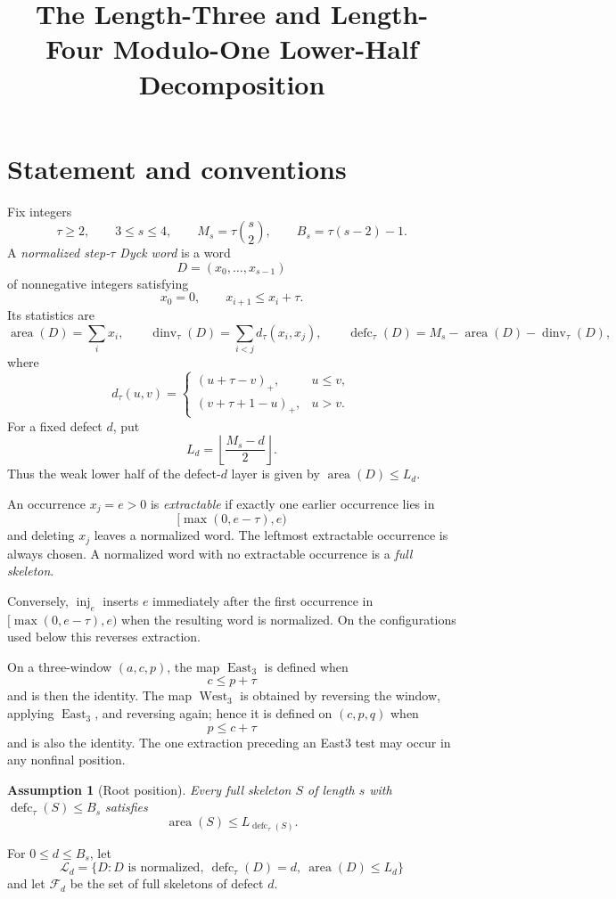 \documentclass[11pt]{article}
\title{The Length-Three and Length-Four Modulo-One Lower-Half Decomposition}
\author{}
\date{}
\newtheorem{assumption}[theorem]{Assumption}
\theoremstyle{definition}
\theoremstyle{remark}
\newcommand{\area}{\operatorname{area}}
\newcommand{\dinv}{\operatorname{dinv}}
\newcommand{\defc}{\operatorname{defc}}
\newcommand{\East}{\operatorname{East}}
\newcommand{\West}{\operatorname{West}}
\newcommand{\inj}{\operatorname{inj}}
\begin{document}
\maketitle

\section{Statement and conventions}

Fix integers
\[
 \tau\ge2,\qquad 3\le s\le4,\qquad
 M_s=\tau\binom{s}{2},\qquad B_s=\tau(s-2)-1.
\]
A \emph{normalized step-$\tau$ Dyck word} is a word
\[
 D=(x_0,\ldots,x_{s-1})
\]
of nonnegative integers satisfying
\[
 x_0=0,\qquad x_{i+1}\le x_i+\tau.
\]
Its statistics are
\[
 \area(D)=\sum_i x_i,\qquad
 \dinv_\tau(D)=\sum_{i<j}d_\tau(x_i,x_j),\qquad
 \defc_\tau(D)=M_s-\area(D)-\dinv_\tau(D),
\]
where
\[
 d_\tau(u,v)=
 \begin{cases}
  (u+\tau-v)_+,&u\le v,\\
  (v+\tau+1-u)_+,&u>v.
 \end{cases}
\]
For a fixed defect $d$, put
\[
 L_d=\left\lfloor\frac{M_s-d}{2}\right\rfloor.
\]
Thus the weak lower half of the defect-$d$ layer is given by
$\area(D)\le L_d$.

An occurrence $x_j=e>0$ is \emph{extractable} if exactly one earlier
occurrence lies in
\[
 [\max(0,e-\tau),e)
\]
and deleting $x_j$ leaves a normalized word.  The leftmost extractable
occurrence is always chosen.  A normalized word with no extractable
occurrence is a \emph{full skeleton}.

Conversely, $\inj_e$ inserts $e$ immediately after the first occurrence in
$[\max(0,e-\tau),e)$ when the resulting word is normalized.  On the
configurations used below this reverses extraction.

On a three-window $(a,c,p)$, the map $\East_3$ is defined when
\[
 c\le p+\tau
\]
and is then the identity.  The map $\West_3$ is obtained by reversing the
window, applying $\East_3$, and reversing again; hence it is defined on
$(c,p,q)$ when
\[
 p\le c+\tau
\]
and is also the identity.  The one extraction preceding an East3 test may
occur in any nonfinal position.

\begin{assumption}[Root position]
\label{ass:root-position}
Every full skeleton $S$ of length $s$ with
$\defc_\tau(S)\le B_s$ satisfies
\[
 \area(S)\le L_{\defc_\tau(S)}.
\]
\end{assumption}

For $0\le d\le B_s$, let
\[
 \mathcal L_d
 =\{D:D\text{ is normalized},\ \defc_\tau(D)=d,\
                         \area(D)\le L_d\}
\]
and let $\mathcal F_d$ be the set of full skeletons of defect $d$.
\end{document}
